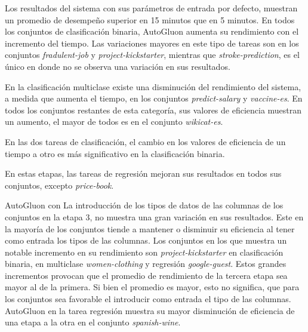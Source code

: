 Los resultados del sistema con sus parámetros de entrada por defecto, muestran un promedio de desempeño superior en 15 minutos que en 5 minutos. 
En todos los conjuntos de clasificación binaria, AutoGluon aumenta su rendimiento con el incremento del tiempo. 
Las variaciones mayores en este tipo de tareas son en los conjuntos \textit{fradulent-job} y \textit{project-kickstarter}, mientras que \textit{stroke-prediction}, 
es el único en donde no se observa una variación en sus resultados.

En la clasificación multiclase existe una disminución del rendimiento del sistema, a medida que aumenta el tiempo, en los conjuntos \textit{predict-salary} y 
\textit{vaccine-es}. En todos los conjuntos restantes de esta categoría, sus valores de eficiencia muestran un aumento, el mayor de todos es en el 
conjunto \textit{wikicat-es}.

En las dos tareas de clasificación, el cambio en los valores de eficiencia de un tiempo a otro es más significativo en la clasificación binaria.

En estas etapas, las tareas de regresión  mejoran sus resultados en todos sus conjuntos, excepto \textit{price-book}.

AutoGluon con La introducción de los tipos de datos de las columnas de los conjuntos en la etapa 3, no muestra una gran variación en sus resultados.
Este en la mayoría de los conjuntos tiende a mantener o disminuir su eficiencia al tener como entrada los tipos de las columnas. Los conjuntos en los que muestra un 
notable incremento en su rendimiento son \textit{project-kickstarter} en clasificación binaria, en multiclase \textit{women-clothing} y regresión 
\textit{google-guest}. Estos grandes incrementos provocan que el promedio de rendimiento de la tercera etapa sea mayor al de la primera. Si bien el promedio es mayor, 
esto no significa, que para los conjuntos sea favorable el introducir como entrada el tipo de las columnas. 
AutoGluon en la tarea regresión muestra su mayor disminución de eficiencia de una etapa a la otra en el conjunto \textit{spanish-wine}.

